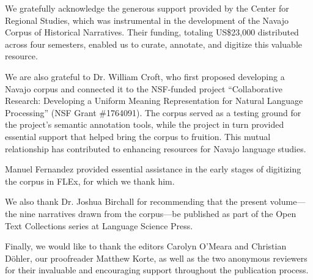 \addchap{\lsAcknowledgementTitle}
We gratefully acknowledge the generous support provided by the Center for Regional Studies, which was instrumental in the development of the Navajo Corpus of Historical Narratives. Their funding, totaling US\$23,000 distributed across four semesters, enabled us to curate, annotate, and digitize this valuable resource.

We are also grateful to Dr. William Croft, who first proposed developing a Navajo corpus and connected it to the NSF-funded project ``Collaborative Research: Developing a Uniform Meaning Representation for Natural Language Processing'' (NSF Grant \#1764091). The corpus served as a testing ground for the project's semantic annotation tools, while the project in turn provided essential support that helped bring the corpus to fruition. This mutual relationship has contributed to enhancing resources for Navajo language studies.

Manuel Fernandez provided essential assistance in the early stages of digitizing the corpus in FLEx, for which we thank him.

We also thank Dr. Joshua Birchall for recommending that the present volume—the nine narratives drawn from the corpus—be published as part of the Open Text Collections series at Language Science Press.

Finally, we would like to thank the editors Carolyn O'Meara and Christian Döhler, our proofreader Matthew Korte, as well as the two anonymous reviewers for their invaluable and encouraging support throughout the publication process.